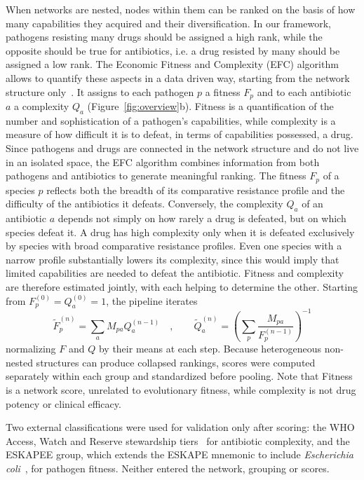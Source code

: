 \documentclass[10pt]{article}
\begin{document}
When networks are nested, nodes within them can be ranked on the basis of how many capabilities they acquired and their diversification. In our framework, pathogens resisting many drugs should be assigned a high rank, while the opposite should be true for antibiotics, i.e. a drug resisted by many should be assigned a low rank. The Economic Fitness and Complexity (EFC) algorithm allows to quantify these aspects in a data driven way, starting from the network structure only~\cite{tacchella2012}. It assigns to each pathogen $p$ a fitness $F_p$ and to each antibiotic $a$ a complexity $Q_a$ (Figure~\ref{fig:overview}b). Fitness is a quantification of the number and sophistication of a pathogen's capabilities, while complexity is a measure of how difficult it is to defeat, in terms of capabilities possessed, a drug. Since pathogens and drugs are connected in the network structure and do not live in an isolated space, the EFC algorithm combines information from both pathogens and antibiotics to generate meaningful ranking. The fitness \(F_p\) of a species \(p\) reflects both the breadth of its comparative resistance profile and the difficulty of the antibiotics it defeats. Conversely, the complexity \(Q_a\) of an antibiotic \(a\) depends not simply on how rarely a drug is defeated, but on which species defeat it. A drug has high complexity only when it is defeated exclusively by species with broad comparative resistance profiles. Even one species with a narrow profile substantially lowers its complexity, since this would imply that limited capabilities are needed to defeat the antibiotic. Fitness and complexity are therefore estimated jointly, with each helping to determine the other. Starting from \(F_p^{(0)}=Q_a^{(0)}=1\), the pipeline iterates
\[
 \widetilde F_p^{(n)}=\sum_aM_{pa}Q_a^{(n-1)} \quad,\qquad
 \widetilde Q_a^{(n)}=\left(\sum_p\frac{M_{pa}}{F_p^{(n-1)}}\right)^{-1}
\]
normalizing \(F\) and \(Q\) by their means at each step. Because heterogeneous non-nested structures can produce collapsed rankings, scores were computed separately within each group and standardized before pooling. Note that Fitness is a network score, unrelated to evolutionary fitness, while complexity is not drug potency or clinical efficacy.

Two external classifications were used for validation only after scoring: the WHO Access, Watch and Reserve stewardship tiers~\cite{aware} for antibiotic complexity, and the ESKAPEE group, which extends the ESKAPE mnemonic to include \emph{Escherichia coli}~\cite{kritsotakis2022}, for pathogen fitness. Neither entered the network, grouping or scores.
\end{document}
